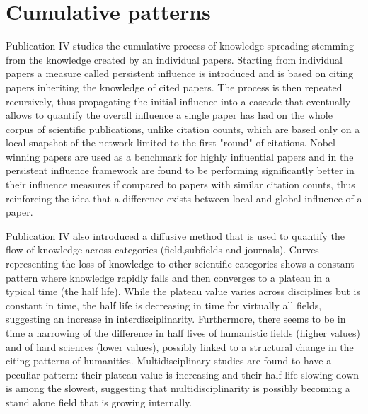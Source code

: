 \section{Cumulative patterns}

Publication IV studies the cumulative process of knowledge spreading stemming from the knowledge created by an individual papers. Starting from individual papers a measure
called persistent influence is introduced and is
based on citing papers inheriting the knowledge of cited papers. The process is then repeated recursively, thus propagating the initial influence into a cascade that eventually allows to quantify
the overall influence a single paper has had on the whole corpus of scientific publications, unlike citation counts, which are based only on a local snapshot of the network limited
to the first "round" of citations. Nobel winning papers are used as a benchmark for highly influential papers and in the persistent influence framework are found to be performing
significantly better in their influence measures if compared to papers with similar citation counts, thus reinforcing the idea that a difference exists between local and global influence
of a paper. 

Publication IV also introduced a diffusive method that is used to quantify the flow of knowledge across categories (field,subfields and journals). Curves representing the loss of knowledge to other
scientific categories shows a constant pattern where knowledge rapidly falls and then converges to a plateau in a typical time (the half life). While the plateau value varies across disciplines but is constant in time,
the half life is decreasing in time for virtually all fields, suggesting an increase in interdisciplinarity. Furthermore, there seems to be in time a narrowing of the difference in
half lives of humanistic fields (higher values) and of hard sciences (lower values), possibly linked to a structural change in the citing patterns of humanities. Multidisciplinary studies
are found to have a peculiar pattern: their plateau value is increasing and their half life slowing down is among the slowest, suggesting that multidisciplinarity is possibly
becoming a stand alone field that is growing internally.

